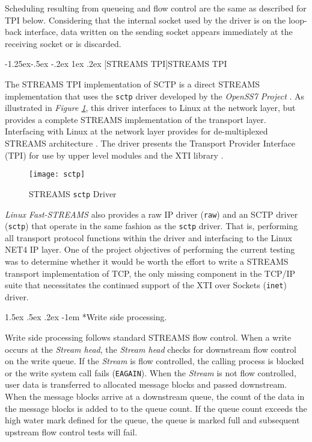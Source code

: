 \documentclass[letterpaper,final,notitlepage,twocolumn,10pt,twoside]{article}
\makeatletter
\let\normalsize = \small
\let\small = \footnotesize
\let\footnotesize = \scriptsize
\let\scriptsize = \tiny
\renewcommand\subsubsection{\@startsection{subsubsection}{3}{\z@}%
                                     {-1.25ex\@plus -.5ex \@minus -.2ex}%
                                     {1ex \@plus .2ex}%
                                     {\normalfont\normalsize\bfseries}}
\renewcommand\paragraph{\@startsection{paragraph}{4}{\z@}%
                                    {1.5ex \@plus .5ex \@minus .2ex}%
                                    {-1em}%
                                    {\normalfont\normalsize\bfseries\slshape}}
\makeatother
\begin{document}
Scheduling resulting from queueing and flow control are the same as described for TPI below.
Considering that the internal socket used by the driver is on the loop-back interface, data written
on the sending socket appears immediately at the receiving socket or is discarded.

\subsubsection[STREAMS TPI]{STREAMS TPI}
\label{section:tpisctp}

The STREAMS TPI implementation of SCTP is a direct STREAMS implementation that uses the
\texttt{sctp} driver developed by the \textsl{OpenSS7 Project} \cite[]{openss7}.  As illustrated in
\textit{Figure \ref{figure:sctp}}, this driver interfaces to Linux at the network layer, but
provides a complete STREAMS implementation of the transport layer.  Interfacing with Linux at the
network layer provides for de-multiplexed STREAMS architecture \cite[]{demux}.  The driver presents
the Transport Provider Interface (TPI) \cite[]{tpi} for use by upper level modules and the XTI
library \cite[]{xti}.

\begin{figure}[htp]
\center\texttt{[image: sctp]}
\caption[STREAMS \texttt{sctp} Driver]{STREAMS \texttt{sctp} Driver}
\label{figure:sctp}
\end{figure}

\textsl{Linux Fast-STREAMS} also provides a raw IP driver (\texttt{raw}) and an SCTP driver
(\texttt{sctp}) that operate in the same fashion as the \texttt{sctp} driver.  That is, performing
all transport protocol functions within the driver and interfacing to the Linux NET4 IP layer.  One
of the project objectives of performing the current testing was to determine whether it would be
worth the effort to write a STREAMS transport implementation of TCP, the only missing component in
the TCP/IP suite that necessitates the continued support of the XTI over Sockets (\texttt{inet})
driver.

\paragraph*{Write side processing.}

Write side processing follows standard STREAMS flow control.  When a write occurs at the
\textit{Stream head}, the \textit{Stream head} checks for downstream flow control on the write
queue.  If the \textit{Stream} is flow controlled, the calling process is blocked or the write
system call fails (\texttt{EAGAIN}).  When the \textit{Stream} is not flow controlled, user data is
transferred to allocated message blocks and passed downstream.  When the message blocks arrive at a
downstream queue, the count of the data in the message blocks is added to to the queue count.  If
the queue count exceeds the high water mark defined for the queue, the queue is marked full and
subsequent upstream flow control tests will fail.
\end{document}
